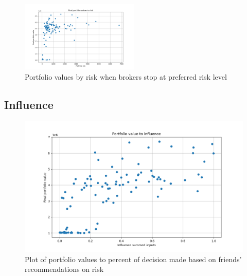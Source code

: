 \documentclass[letterpaper, 11 pt, proceedings]{IEEEtran}
\begin{document}
	\begin{figure}[h]
		\centering
		\includegraphics[width=0.5\textwidth]{valueToRisk_stopatstable.png}
		\caption{Portfolio values by risk when brokers stop at preferred risk level}
		\label{stopatstable}
	\end{figure}
	\FloatBarrier
	
	\subsection{Influence}
	
	\begin{figure}[h]
		\centering
		\includegraphics[width=.5\textwidth]{valueToInfluence_influence04.png}
		\caption{Plot of portfolio values to percent of decision made based on friends' recommendations on risk}
		\label{fig:value_to_influence_influencerun}
	\end{figure}	
	\FloatBarrier
\end{document}
